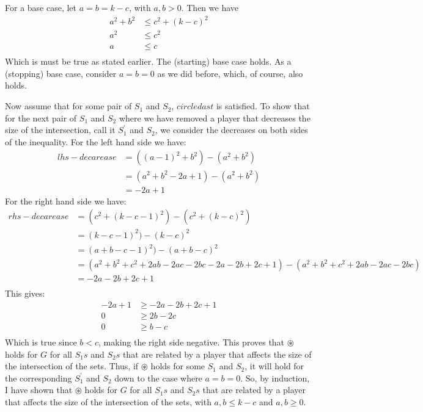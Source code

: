 \documentclass{article}
\begin{document}
\begin{enumerate}
For a base case, let $a = b = k - c$, with $a, b > 0$. Then we have
\begin{align*}
a^{2} + b^{2}  &\le  c^{2} + (k - c)^{2} \\
a^{2}          &\le  c^{2} \\
a              &\le  c \\
\end{align*}
 Which is must be true as stated earlier. The (starting) base case holds.
As a (stopping) base case, consider $a = b = 0$ as we did before, which, of course, also holds.

Now assume that for some pair of $S_{1}$ and $S_{2}$, $circledast$ is satisfied.
To show that for the next pair of $S_{1}$ and $S_{2}$ where we have removed a player that decreases the size of the intersection, call it $S_{1}^{\prime}$ and $S_{2}$, we consider the decreases on both sides of the inequality.
For the left hand side we have:
\begin{align*}
lhs-decarease  &=  ((a - 1)^{2} + b^{2})    - (a^{2} + b^{2})  \\
               &=  (a^{2} + b^{2} - 2a + 1) - (a^{2} + b^{2})  \\
               &=  -2a + 1
\end{align*}
For the right hand side we have:
\begin{align*}
rhs-decarease  &=  (c^{2} + (k - c - 1)^{2}) - (c^{2} + (k - c)^{2})  \\
               &=  (k - c - 1)^{2}) - (k - c)^{2} \\
               &=  (a + b - c - 1)^{2}) - (a + b - c)^{2} \\
               &=  (a^{2} + b^{2} + c^{2} + 2ab - 2ac - 2bc - 2a - 2b + 2c + 1) - (a^{2} + b^{2} + c^{2} + 2ab - 2ac - 2bc) \\
               &=  -2a - 2b + 2c + 1 \\
\end{align*}
This gives:
\begin{align*}
-2a + 1 &\ge -2a - 2b + 2c + 1 \\
 0      &\ge 2b - 2c \\
 0      &\ge b - c \\
\end{align*}
Which is true since $b < c$, making the right side negative. This proves that $\circledast$ holds for $G$ for all $S_{1}s$ and $S_{2}s$ that are related by a player that affects the size of the intersection of the sets. Thus, if $\circledast$ holds for some $S_{1}$ and $S_{2}$, it will hold for the corresponding $S_{1}^{\prime}$ and $S_{2}$ down to the case where $a = b = 0$. So, by induction, I have shown that $\circledast$ holds for $G$ for all $S_{1}s$ and $S_{2}s$ that are related by a player that affects the size of the intersection of the sets, with $a, b \le k - c$ and $a, b \ge 0$.


\end{enumerate}
\end{document}
